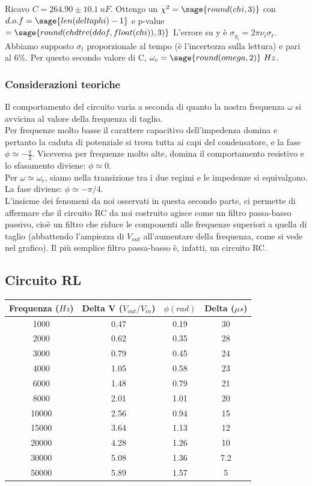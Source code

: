 Ricavo $C=264.90 \pm 10.1\ nF$.
Ottengo un $\chi^2 = \sage{round(chi,3)}$ con $d.o.f= \sage{len(deltaphi)-1}$ e p-value $=\sage{round(chdtrc(ddof,float(chi)),3)}$
L'errore su y è $\sigma_{y_i} = 2 \pi \nu_i \sigma_{t}$. Abbiamo supposto $\sigma_{t}$ proporzionale al tempo (è l'incertezza sulla lettura) e pari al $6\%$.
Per questo secondo valore di C, $\omega_c = \sage{round(omega,2)}\ Hz$. 

\subsubsection{Considerazioni teoriche}
Il comportamento del circuito varia a seconda di quanto la nostra frequenza $\omega$ si avvicina al valore della frequenza di taglio. \\
Per frequenze molto basse il carattere capacitivo dell'impedenza domina e pertanto la caduta di potenziale si trova tutta ai capi del condensatore, e la fase $\phi \simeq -\frac{\pi}{2}$. Viceversa per frequenze molto alte, domina il comportamento resistivo e lo sfasamento diviene: $ \phi \simeq 0$. \\  
Per $\omega \simeq \omega_c$, siamo nella transizione tra i due regimi e le impedenze si equivalgono. La fase diviene: $ \phi \simeq -\pi/4$.  \\

L'insieme dei fenomeni da noi osservati in questa secondo parte, ci permette di affermare che il circuito RC da noi costruito agisce come un filtro passa-basso passivo, cioè un filtro che riduce le componenti alle frequenze superiori a quella di taglio (abbattendo l'ampiezza di $V_{out}$ all'aumentare della frequenza, come si vede nel grafico). Il più semplice filtro passa-basso è, infatti, un circuito RC. 

\subsection*{Circuito RL}
\begin{center}

\begin{tabular}{*{4}{c}}
Frequenza ($Hz$) & Delta V ($V_{out}/V_{in}$) & $\phi (rad)$ & Delta ($\mu s$) \\
\midrule
1000& 0.47 & 0.19 & 30 \\
2000 & 0.62 & 0.35 & 28\\
3000 & 0.79 & 0.45 & 24\\
4000 & 1.05 & 0.58 & 23\\
6000 & 1.48 & 0.79 & 21\\
8000 & 2.01 & 1.01 & 20\\
10000 & 2.56 & 0.94 & 15\\
15000 & 3.64 & 1.13 & 12\\
20000 & 4.28 & 1.26 & 10 \\
30000 & 5.08 & 1.36 & 7.2\\
50000 & 5.89 & 1.57 & 5\\
\end{tabular}
\end{center}



